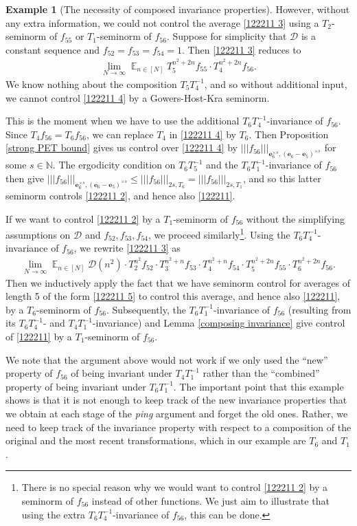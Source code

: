 \documentclass[11pt]{amsart}
\theoremstyle{definition}
\newtheorem{example}{Example}
\newcommand{\N}{{\mathbb N}}
\newcommand{\CD}{{\mathcal D}}
\newcommand{\be}{{\mathbf{e}}}
\newcommand{\nnorm}[1]{\lvert\!|\!| #1|\!|\!\rvert}
\newcommand{\inv}{^{-1}}
\DeclareMathOperator*{\E}{\mathbb{E}}
\begin{document}
\begin{example}[The necessity of composed invariance properties]
However, without any extra information, we could not control the average \eqref{122211 3} using a $T_2$-seminorm of $f_{55}$ or $T_1$-seminorm of $f_{56}$. Suppose for simplicity that $\CD$ is a constant sequence and $f_{52}=f_{53}=f_{54} = 1$. Then \eqref{122211 3} reduces to
\begin{align}\label{122211 4}
    \lim_{N\to\infty}\E_{n\in[N]}T_5^{n^2+2n}f_{55}\cdot T_4^{n^2+2n}f_{56}.
\end{align}
We know nothing about the composition $T_5 T_4\inv$, and so without additional input, we cannot control \eqref{122211 4} by a Gowers-Host-Kra seminorm.

This is the moment when we have to use the additional $T_6T_4\inv$-invariance of $f_{56}$. Since $T_4 f_{56} = T_6 f_{56}$, we can replace $T_4$ in \eqref{122211 4} by $T_6$. Then Proposition \ref{strong PET bound} gives us control over \eqref{122211 4} by $\nnorm{f_{56}}_{\be_6^{\times s}, (\be_6-\be_5)^{\times s}}$ for some $s\in\N$. The ergodicity condition on $T_6 T_5\inv$ and the $T_6 T_1\inv$-invariance of $f_{56}$ then give  $\nnorm{f_{56}}_{\be_6^{\times s}, (\be_6-\be_5)^{\times s}}\leq \nnorm{f_{56}}_{2s, T_6}= \nnorm{f_{56}}_{2s, T_1}$, and so this latter seminorm controls \eqref{122211 2}, and hence also \eqref{122211}.

If we want to control \eqref{122211 2} by a $T_1$-seminorm of $f_{56}$ without the simplifying assumptions on $\CD$ and $f_{52}, f_{53}, f_{54}$, we proceed similarly\footnote{There is no special reason why we would want to control \eqref{122211 2} by a seminorm of $f_{56}$ instead of other functions. We just aim to illustrate that  using the extra $T_6T_4\inv$-invariance of $f_{56}$, this can be done.}. Using the $T_6T_4\inv$-invariance of $f_{56}$, we rewrite \eqref{122211 3} as
\begin{align}\label{122211 5}
    \lim_{N\to\infty}\E_{n\in[N]}\CD(n^2)\cdot T_2^{n^2}f_{52}\cdot T_3^{n^2+n}f_{53}\cdot T_4^{n^2+n}f_{54} \cdot T_5^{n^2+2n}f_{55}\cdot T_6^{n^2+2n}f_{56}.
\end{align}
Then we inductively apply the fact that we have seminorm control for averages of length 5 of the form \eqref{122211 5} to control this average, and hence also \eqref{122211}, by a $T_6$-seminorm of $f_{56}$. Subsequently, the $T_6 T_1\inv$-invariance of $f_{56}$ (resulting from its $T_6 T_4\inv$- and $T_4T_1\inv$-invariance) and Lemma \ref{composing invariance} give control of \eqref{122211} by a $T_1$-seminorm of $f_{56}$.

We note that the argument above would not work if we only used the ``new'' property of $f_{56}$ of being invariant under $T_4 T_1\inv$ rather than the ``combined'' property of being invariant under $T_6 T_1\inv$. The important point that this example shows is that it is not enough to keep track of the new invariance properties that we obtain at each stage of the \textit{ping} argument and forget the old ones. Rather, we need to keep track of the invariance property with respect to a composition of the original and the most recent transformations, which in our example are $T_6$ and $T_1$.
\end{example}
\end{document}
